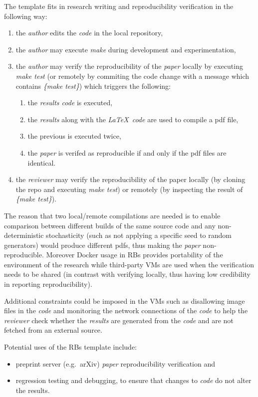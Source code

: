 \documentclass[journal]{IEEEtran}
\begin{document}
The template fits in research writing and reproducibility verification in the following way:
\begin{enumerate}
	\item the \textit{author} edits the \textit{code} in the local repository,
	\item the \textit{author} may execute \textit{make} during development and experimentation,
	\item the \textit{author} may verify the reproducibility of the \textit{paper} locally by executing \textit{make test} (or remotely by commiting the code change with a message which contains \textit{\{make test\}}) which triggers the following:
		\begin{enumerate}
			\item the \textit{results code} is executed,
			\item the \textit{results} along with the \textit{\LaTeX\ code} are used to compile a pdf file,
			\item the previous is executed twice,
			\item the \textit{paper} is verifed as reproducible if and only if the pdf files are identical.
		\end{enumerate}
	\item the \textit{reviewer} may verify the reproducibility of the paper locally (by cloning the repo and executing \textit{make test}) or remotely (by inspecting the result of \textit{\{make test\}}).
\end{enumerate}

The reason that two local/remote compilations are needed is to enable comparison between different builds of the same source code and any non-deterministic stochasticity (such as not applying a specific seed to random generators) would produce different pdfs, thus making the \textit{paper} non-reproducible.
Moreover Docker usage in RBs provides portability of the environment of the research while third-party VMs are used when the verification needs to be shared (in contrast with verifying locally, thus having low credibility in reporting reproducibility).

Additional constraints could be imposed in the VMs such as disallowing image files in the \textit{code} and monitoring the network connections of the \textit{code} to help the \textit{reviewer} check whether the \textit{results} are generated from the \textit{code} and are not fetched from an external source.

Potential uses of the RBs template include:
\begin{itemize}
	\item preprint server (e.g.\ arXiv) \textit{paper} reproducibility verification and
	\item regression testing and debugging, to ensure that changes to \textit{code} do not alter the results.
\end{itemize}
\end{document}
